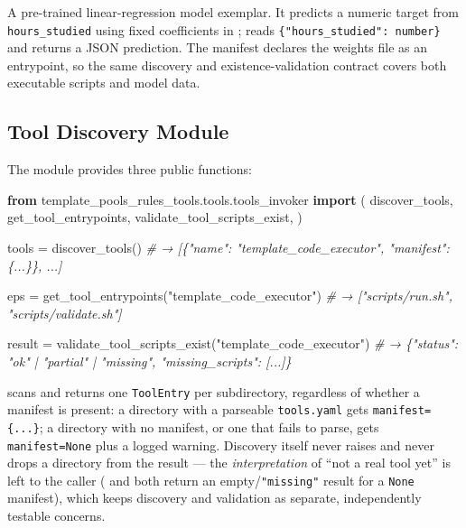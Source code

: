 \documentclass[
]{article}
\newenvironment{Shaded}{}{}
\newcommand{\CommentTok}[1]{\textcolor[rgb]{0.38,0.63,0.69}{\textit{#1}}}
\newcommand{\ImportTok}[1]{\textcolor[rgb]{0.00,0.50,0.00}{\textbf{#1}}}
\newcommand{\NormalTok}[1]{#1}
\newcommand{\OperatorTok}[1]{\textcolor[rgb]{0.40,0.40,0.40}{#1}}
\newcommand{\StringTok}[1]{\textcolor[rgb]{0.25,0.44,0.63}{#1}}
\begin{document}
A pre-trained linear-regression model exemplar. It predicts a numeric
target from \texttt{hours\_studied} using fixed coefficients in
;  reads
\texttt{\{"hours\_studied":\ number\}} and returns a JSON prediction.
The manifest declares the weights file as an entrypoint, so the same
discovery and existence-validation contract covers both executable
scripts and model data.

\subsection{Tool Discovery Module}\label{tool-discovery-module}

The 
module provides three public functions:

\begin{Shaded}
\begin{Highlighting}[]
\ImportTok{from}\NormalTok{ template\_pools\_rules\_tools.tools.tools\_invoker }\ImportTok{import}\NormalTok{ (}
\NormalTok{    discover\_tools,}
\NormalTok{    get\_tool\_entrypoints,}
\NormalTok{    validate\_tool\_scripts\_exist,}
\NormalTok{)}

\NormalTok{tools }\OperatorTok{=}\NormalTok{ discover\_tools()}
\CommentTok{\# → [\{"name": "template\_code\_executor", "manifest": \{...\}\}, ...]}

\NormalTok{eps }\OperatorTok{=}\NormalTok{ get\_tool\_entrypoints(}\StringTok{"template\_code\_executor"}\NormalTok{)}
\CommentTok{\# → ["scripts/run.sh", "scripts/validate.sh"]}

\NormalTok{result }\OperatorTok{=}\NormalTok{ validate\_tool\_scripts\_exist(}\StringTok{"template\_code\_executor"}\NormalTok{)}
\CommentTok{\# → \{"status": "ok" | "partial" | "missing", "missing\_scripts": [...]\}}
\end{Highlighting}
\end{Shaded}

 scans  and returns
one \texttt{ToolEntry} per subdirectory, regardless of whether a
manifest is present: a directory with a parseable \texttt{tools.yaml}
gets \texttt{manifest=\{...\}}; a directory with no manifest, or one
that fails to parse, gets \texttt{manifest=None} plus a logged warning.
Discovery itself never raises and never drops a directory from the
result --- the \emph{interpretation} of ``not a real tool yet'' is left
to the caller ( and
 both return an
empty/\texttt{"missing"} result for a \texttt{None} manifest), which
keeps discovery and validation as separate, independently testable
concerns.
\end{document}
